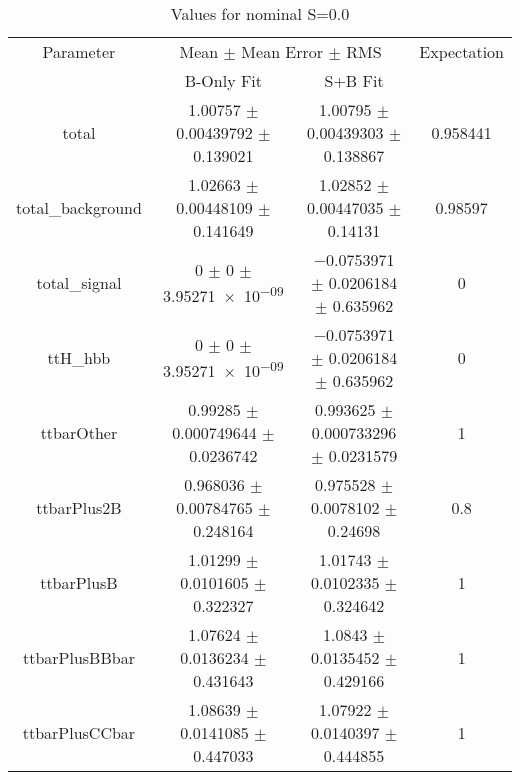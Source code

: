 \begin{table}
\centering
\caption{Values for nominal S=0.0}
\begin{tabular}{cccc}
\toprule
Parameter & \multicolumn{2}{c}{Mean $\pm$ Mean Error $\pm$ RMS} & Expectation\\
 & B-Only Fit & S+B Fit & \\
\midrule
total & \num{1.00757} $\pm$ \num{0.00439792} $\pm$ \num{0.139021} & \num{1.00795} $\pm$ \num{0.00439303} $\pm$ \num{0.138867} & \num{0.958441}\\
total\_background & \num{1.02663} $\pm$ \num{0.00448109} $\pm$ \num{0.141649} & \num{1.02852} $\pm$ \num{0.00447035} $\pm$ \num{0.14131} & \num{0.98597}\\
total\_signal & \num{0} $\pm$ \num{0} $\pm$ \num{3.95271e-09} & \num{-0.0753971} $\pm$ \num{0.0206184} $\pm$ \num{0.635962} & \num{0}\\
ttH\_hbb & \num{0} $\pm$ \num{0} $\pm$ \num{3.95271e-09} & \num{-0.0753971} $\pm$ \num{0.0206184} $\pm$ \num{0.635962} & \num{0}\\
ttbarOther & \num{0.99285} $\pm$ \num{0.000749644} $\pm$ \num{0.0236742} & \num{0.993625} $\pm$ \num{0.000733296} $\pm$ \num{0.0231579} & \num{1}\\
ttbarPlus2B & \num{0.968036} $\pm$ \num{0.00784765} $\pm$ \num{0.248164} & \num{0.975528} $\pm$ \num{0.0078102} $\pm$ \num{0.24698} & \num{0.8}\\
ttbarPlusB & \num{1.01299} $\pm$ \num{0.0101605} $\pm$ \num{0.322327} & \num{1.01743} $\pm$ \num{0.0102335} $\pm$ \num{0.324642} & \num{1}\\
ttbarPlusBBbar & \num{1.07624} $\pm$ \num{0.0136234} $\pm$ \num{0.431643} & \num{1.0843} $\pm$ \num{0.0135452} $\pm$ \num{0.429166} & \num{1}\\
ttbarPlusCCbar & \num{1.08639} $\pm$ \num{0.0141085} $\pm$ \num{0.447033} & \num{1.07922} $\pm$ \num{0.0140397} $\pm$ \num{0.444855} & \num{1}\\
\bottomrule
\end{tabular}
\end{table}